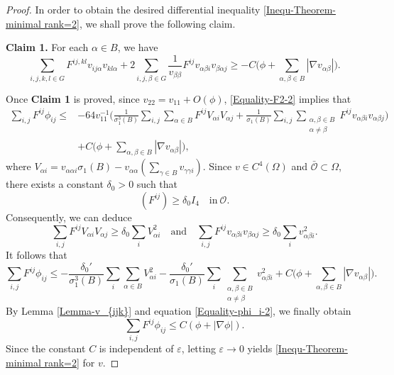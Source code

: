 \documentclass[11pt]{amsart}
\numberwithin{theorem}{section}
\numberwithin{equation}{section}
\begin{document}
\begin{proof}
In order to obtain the desired differential inequality \eqref{Inequ-Theorem-minimal rank=2}, we shall prove the following claim.
 
\textbf{Claim 1.} For each $\alpha\in B$, we have
\begin{equation}\label{Claim}
\sum_{i,j,k,l\in G}F^{ij,kl}v_{ij\alpha}v_{kl\alpha}+2\sum_{i,j,\beta\in G}\frac{1}{v_{\beta\beta}}F^{ij}v_{\alpha\beta i}v_{\beta\alpha j}\geq -C\bigg(\phi+\sum_{\alpha,\beta\in B}|\nabla v_{\alpha\beta}|\bigg).
\end{equation}
 
Once \textbf{Claim 1} is proved, since $v_{22}=v_{11}+O(\phi)$, \eqref{Equality-F2-2} implies that
\begin{align*}
\sum_{i, j}F^{ij}\phi_{ij} \leq&-64v_{11}^{-1}\bigg(\frac{1}{\sigma_1^3(B)}\sum_{i, j} \sum_{\alpha\in B}F^{ij}V_{\alpha i}V_{\alpha j} +\frac{1}{\sigma_1(B)} \sum_{i,j} \sum_{\substack{\alpha, \beta\in B\\ \alpha\neq\beta}} F^{ij}v_{\alpha\beta i}v_{\alpha\beta j}\bigg)\\
&+C\bigg(\phi+\sum_{\alpha, \beta\in B}|\nabla v_{\alpha\beta}|\bigg),
\end{align*}
where $V_{\alpha i}=v_{\alpha\alpha i}\sigma_1(B)-v_{\alpha\alpha} \left(\sum_{\gamma\in B}v_{\gamma\gamma i}\right)$. Since $v\in C^4(\Omega)$ and $\bar{\mathcal{O}}\subset\Omega$, there exists a constant $\delta_0>0$ such that $$(F^{ij})\geq\delta_0I_4\quad \mbox{in}\ \mathcal{O}. $$ Consequently, we can deduce $$\sum_{i,j}F^{ij}V_{\alpha i}V_{\alpha j}\geq\delta_0\sum_i V_{\alpha i}^2 \quad \mathrm{and} \quad \sum_{i,j}F^{ij} v_{\alpha\beta i}v_{\beta\alpha j}\geq\delta_0\sum_i v_{\alpha\beta i}^2. $$ It follows that $$\sum_{i,j}F^{ij}\phi_{ij}\leq -\frac{\delta_0'}{\sigma_1^3(B)}\sum_i\sum_{\alpha\in B}V_{\alpha i}^2-\frac{\delta_0'}{\sigma_1(B)} \sum_i\sum_{\substack{\alpha, \beta\in B\\ \alpha\neq\beta}}v_{\alpha\beta i}^2+C\bigg(\phi+\sum_{\alpha,\beta\in B}|\nabla v_{\alpha\beta}|\bigg). $$ By Lemma \ref{Lemma-v_{ijk}} and equation \eqref{Equality-phi_i-2}, we finally obtain $$\sum_{i, j}F^{ij}\phi_{ij}\leq C(\phi+|\nabla\phi|). $$ Since the constant $C$ is independent of $\varepsilon$, letting $\varepsilon\rightarrow 0$ yields \eqref{Inequ-Theorem-minimal rank=2} for $v$. 
\end{proof}
\end{document}
